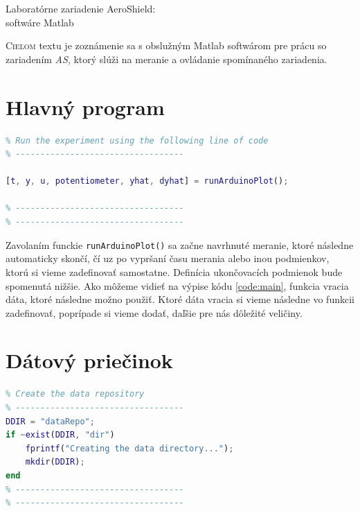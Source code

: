 \documentclass[a4paper, 10pt, ]{article}
\begin{document}
\begin{flushleft}
    Laboratórne zariadenie AeroShield:\\ softwáre Matlab
\end{flushleft}

\bigskip

\normalsize
\normalfont

\lstset{style=mystyle}










\noindent
\lettrine[lines=1, nindent=1pt, loversize=0.0]{C}{ieľom}
textu je zoznámenie sa s obslužným Matlab softwárom pre prácu so zariadením \emph{AS}, ktorý slúži na meranie a ovládanie spomínaného zariadenia.


\section{Hlavný program}
\begin{lstlisting}[caption=Zavolanie funkcie merania., label={code:main}, language=Matlab]
% ----------------------------------
% Run the experiment using the following line of code
% ----------------------------------

[t, y, u, potentiometer, yhat, dyhat] = runArduinoPlot();

% ----------------------------------
% ----------------------------------
\end{lstlisting}

Zavolaním funckie \texttt{runArduinoPlot()} sa začne navrhnuté meranie, ktoré následne automaticky skončí, čí uz po vypršaní času merania alebo inou podmienkov, ktorú si vieme zadefinovať samostatne. Definícia ukončovacích podmienok bude spomenutá nižšie. Ako môžeme vidieť na výpise kódu \ref{code:main}, funkcia vracia dáta, ktoré následne možno použiť.
Ktoré dáta vracia si vieme následne vo funkcii zadefinovať, poprípade si vieme dodať, daľšie pre nás dôležité veličiny.

\section{Dátový priečinok}
\begin{lstlisting}[caption=Vytvorenie dátového priečinku., label={code:repo}, language=Matlab]
% ----------------------------------
% Create the data repository
% ----------------------------------
DDIR = "dataRepo";
if ~exist(DDIR, "dir")
    fprintf("Creating the data directory...");
    mkdir(DDIR);
end
% ----------------------------------
% ----------------------------------
\end{lstlisting}
\end{document}
